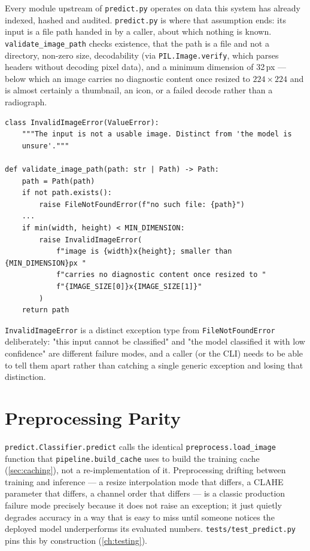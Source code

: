 \documentclass[11pt,a4paper,oneside]{report}
\newcommand{\code}[1]{\texttt{\small #1}}
\begin{document}
Every module upstream of \code{predict.py} operates on data this system has
already indexed, hashed and audited. \code{predict.py} is where that
assumption ends: its input is a file path handed in by a caller, about which
nothing is known. \code{validate\_image\_path} checks existence, that the
path is a file and not a directory, non-zero size, decodability (via
\code{PIL.Image.verify}, which parses headers without decoding pixel data),
and a minimum dimension of 32\,px --- below which an image carries no
diagnostic content once resized to $224\times224$ and is almost certainly a
thumbnail, an icon, or a failed decode rather than a radiograph.

\begin{lstlisting}[caption={Validation happens before anything expensive
touches the input (\texttt{lxnet/predict.py}).}, label=lst:validate]
class InvalidImageError(ValueError):
    """The input is not a usable image. Distinct from 'the model is
    unsure'."""

def validate_image_path(path: str | Path) -> Path:
    path = Path(path)
    if not path.exists():
        raise FileNotFoundError(f"no such file: {path}")
    ...
    if min(width, height) < MIN_DIMENSION:
        raise InvalidImageError(
            f"image is {width}x{height}; smaller than {MIN_DIMENSION}px "
            f"carries no diagnostic content once resized to "
            f"{IMAGE_SIZE[0]}x{IMAGE_SIZE[1]}"
        )
    return path
\end{lstlisting}

\code{InvalidImageError} is a distinct exception type from
\code{FileNotFoundError} deliberately: "this input cannot be classified" and
"the model classified it with low confidence" are different failure modes,
and a caller (or the CLI) needs to be able to tell them apart rather than
catching a single generic exception and losing that distinction.

\section{Preprocessing Parity}

\code{predict.Classifier.predict} calls the identical
\code{preprocess.load\_image} function that \code{pipeline.build\_cache}
uses to build the training cache (\cref{sec:caching}), not a re-implementation
of it. Preprocessing drifting between training and inference --- a resize
interpolation mode that differs, a CLAHE parameter that differs, a channel
order that differs --- is a classic production failure mode precisely
because it does not raise an exception; it just quietly degrades accuracy in
a way that is easy to miss until someone notices the deployed model
underperforms its evaluated numbers. \texttt{tests/test\_predict.py} pins
this by construction (\cref{ch:testing}).
\end{document}
